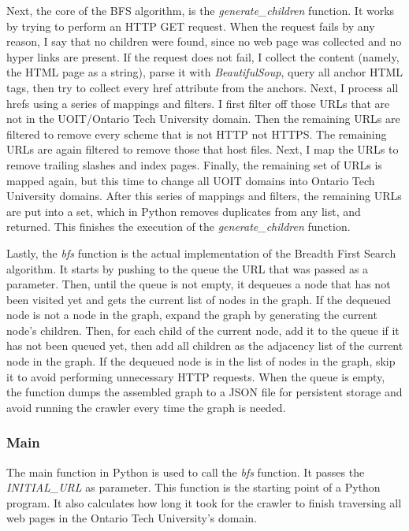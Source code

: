 Next, the core of the BFS algorithm, is the \textit{generate\_children} function. It works by trying to perform an HTTP GET request. When the request fails by any reason, I say that no children were found, since no web page was collected and no hyper links are present. If the request does not fail, I collect the content (namely, the HTML page as a string), parse it with \textit{BeautifulSoup}, query all anchor HTML tags, then try to collect every href attribute from the anchors. Next, I process all hrefs using a series of mappings and filters. I first filter off those URLs that are not in the UOIT/Ontario Tech University domain. Then the remaining URLs are filtered to remove every scheme that is not HTTP not HTTPS. The remaining URLs are again filtered to remove those that host files. Next, I map the URLs to remove trailing slashes and index pages. Finally, the remaining set of URLs is mapped again, but this time to change all UOIT domains into Ontario Tech University domains. After this series of mappings and filters, the remaining URLs are put into a set, which in Python removes duplicates from any list, and returned. This finishes the execution of the \textit{generate\_children} function.

Lastly, the \textit{bfs} function is the actual implementation of the Breadth First Search algorithm. It starts by pushing to the queue the URL that was passed as a parameter. Then, until the queue is not empty, it dequeues a node that has not been visited yet and gets the current list of nodes in the graph. If the dequeued node is not a node in the graph, expand the graph by generating the current node's children. Then, for each child of the current node, add it to the queue if it has not been queued yet, then add all children as the adjacency list of the current node in the graph. If the dequeued node is in the list of nodes in the graph, skip it to avoid performing unnecessary HTTP requests. When the queue is empty, the function dumps the assembled graph to a JSON file for persistent storage and avoid running the crawler every time the graph is needed.

\subsubsection{Main}
The main function in Python is used to call the \textit{bfs} function. It passes the \textit{INITIAL\_URL} as parameter. This function is the starting point of a Python program. It also calculates how long it took for the crawler to finish traversing all web pages in the Ontario Tech University's domain.

